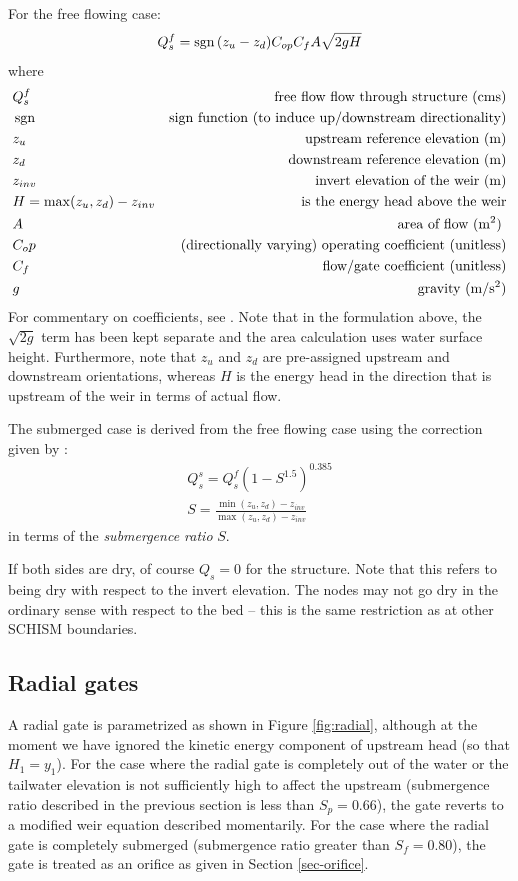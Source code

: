 For the free flowing case:
$$
Q_s^f=\operatorname{sgn}{(z_{u} - z_{d})} C_{op} C_{f} A \sqrt{2g H}
$$
where 
\begin{align*}
&Q_s^f  &\text{free flow flow through structure (cms)} &\\
&\operatorname{sgn}        &\text{sign function (to induce up/downstream directionality)}  &\\
&z_u         &\text{upstream reference elevation  (m)}  &\\
&z_d         &\text{downstream reference elevation (m)}  &\\
&z_{inv}     &\text{invert elevation of the weir (m)}  &\\
&H = \max(z_u,z_d) - z_{inv}  &\text{is the energy head above the weir} &\\
&A                            &\text{area of flow (m\textsuperscript{2}) }&\\
&C_op               &\text{(directionally varying) operating coefficient (unitless)} &\\
&C_f                &\text{flow/gate coefficient (unitless)}  &\\
&g                  & \text{gravity (m/s\textsuperscript{2})} & \\
\end{align*}
For commentary on coefficients, see \cite{Rantz82}. Note that in the formulation above, the $\sqrt{2g}$
term has been kept separate and the area calculation uses water surface height. 
Furthermore, note that $z_u$ and $z_d$ are pre-assigned upstream and downstream orientations,
whereas $H$ is the energy head in the direction that is upstream of the weir in terms of actual flow.

The submerged case is derived from the free flowing case using the correction given by \citet{Villemonte47}:
\begin{align*}
Q_s^s = Q_s^f(1 - S^{1.5})^{0.385} \\
S = \frac{\min(z_u,z_d) - z_{inv}}{\max(z_u,z_d) - z_{inv}}
\end{align*}
in terms of the {\em submergence ratio} $S$.

If both sides are dry, of course $Q_s=0$ for the structure. Note that this refers to being dry with respect to the invert elevation.
The nodes may not go dry in the ordinary sense with respect to the bed -- this is the same restriction as at other SCHISM boundaries. 

\subsection{Radial gates} 
\label{sec:radial}
A radial gate is parametrized as shown in Figure \ref{fig:radial}, although at the moment we have ignored the kinetic 
energy component of upstream head (so that $H_1 = y_1$). For the case where the radial gate is completely out
of the water or the tailwater elevation is not sufficiently high to affect the upstream (submergence ratio described in the previous
section is less than $S_p=0.66$),
the gate reverts to a modified weir equation described momentarily. For the case where the radial gate is completely submerged 
(submergence ratio greater than $S_f=0.80$),
the gate is treated as an orifice as given in Section \ref{sec-orifice}.


